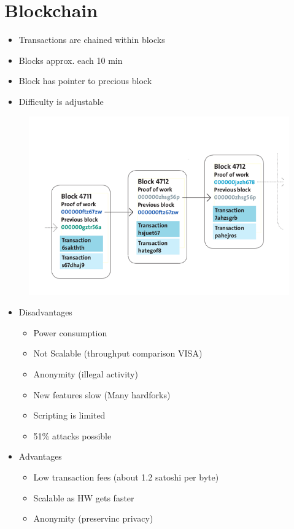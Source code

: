 \documentclass[../Main.tex]{subfiles}
\begin{document}
\section{Blockchain}
\begin{itemize}
    \item Transactions are chained within blocks
    \item Blocks approx. each 10 min
    \item Block has pointer to precious block
    \item Difficulty is adjustable
\end{itemize}
\begin{figure}[H]
    \centering
    \includegraphics[width=0.75\linewidth]{Images/blockchain/blockchain.png}
\end{figure}
\begin{itemize}
    \item Disadvantages
          \begin{itemize}
              \item Power consumption
              \item Not Scalable (throughput comparison VISA)
              \item Anonymity (illegal activity)
              \item New features slow (Many hardforks)
              \item Scripting is limited
              \item 51\% attacks possible
          \end{itemize}
    \item Advantages
          \begin{itemize}
              \item Low transaction fees (about 1.2 satoshi per byte)
              \item Scalable as HW gets faster
              \item Anonymity (preservinc privacy)
          \end{itemize}
\end{itemize}
\end{document}
